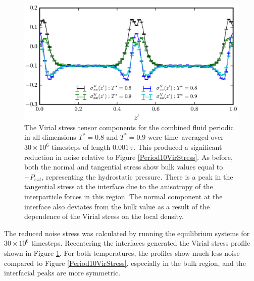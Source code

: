 \begin{figure}[h!]
\centering
\includegraphics[scale=1.0]{Period30VirStress}
\caption{The Virial stress tensor components for the combined fluid periodic in all dimensions $T^{*} = 0.8$ and $T^{*} = 0.9$ were time--averaged over $30 \times 10^{6}$ timesteps of length $0.001\ \tau$.
This produced a significant reduction in noise relative to Figure \ref{Period10VirStress}.
As before, both the normal and tangential stress show bulk values equal to $-P_{ext}$, representing the hydrostatic pressure.
There is a peak in the tangential stress at the interface due to the anisotropy of the interparticle forces in this region.
The normal component at the interface also deviates from the bulk value as a result of the dependence of the Virial stress on the local density.
}
\label{Period30VirStress}
\end{figure}

The reduced noise stress was calculated by running the equilibrium systems for $30 \times 10^{6}$ timesteps.
Recentering the interfaces generated the Virial stress profile shown in Figure \ref{Period30VirStress}.
For both temperatures, the profiles show much less noise compared to Figure \ref{Period10VirStress}, especially in the bulk region, and the interfacial peaks are more symmetric.
\FloatBarrier

